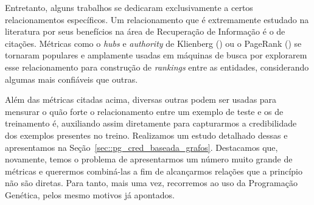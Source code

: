 Entretanto, alguns trabalhos se dedicaram exclusivamente a certos relacionamentos específicos.
Um relacionamento que é extremamente estudado na literatura por seus benefícios na área de Recuperação de Informação é o de citações.
Métricas como o \textit{hubs} e \textit{authority} de Klienberg (\cite{Kleinberg99}) ou o PageRank (\cite{Page98}) se tornaram populares e amplamente usadas em máquinas de busca por explorarem esse relacionamento para construção de \textit{rankings} entre as entidades, considerando algumas mais confiáveis que outras.

Além das métricas citadas acima, diversas outras podem ser usadas para mensurar o quão forte o relacionamento entre um exemplo de teste e os de treinamento é, auxiliando assim diretamente para capturarmos a credibilidade dos exemplos presentes no treino. Realizamos um estudo detalhado dessas e apresentamos na Seção~\ref{sec::pg_cred_baseada_grafos}.
Destacamos que, novamente, temos o problema de apresentarmos um número muito grande de métricas e querermos combiná-las a fim de alcançarmos relações que a princípio não são diretas.
Para tanto, mais uma vez, recorremos ao uso da Programação Genética, pelos mesmo motivos já apontados.


